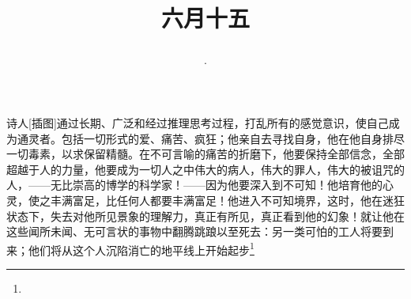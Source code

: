 \title{\date[d=20,m=7,y=2024][year:cn-y,年,month:cn,day:cn,日,·,weekday]·六月十五 }
诗人[插图]通过长期、广泛和经过推理思考过程，打乱所有的感觉意识，使自己成为通灵者。包括一切形式的爱、痛苦、疯狂；他亲自去寻找自身，他在他自身排尽一切毒素，以求保留精髓。在不可言喻的痛苦的折磨下，他要保持全部信念，全部超越于人的力量，他要成为一切人之中伟大的病人，伟大的罪人，伟大的被诅咒的人，——无比崇高的博学的科学家！——因为他要深入到不可知！他培育他的心灵，使之丰满富足，比任何人都要丰满富足！他进入不可知境界，这时，他在迷狂状态下，失去对他所见景象的理解力，真正有所见，真正看到他的幻象！就让他在这些闻所未闻、无可言状的事物中翻腾跳踉以至死去：另一类可怕的工人将要到来；他们将从这个人沉陷消亡的地平线上开始起步\footnote{ }

